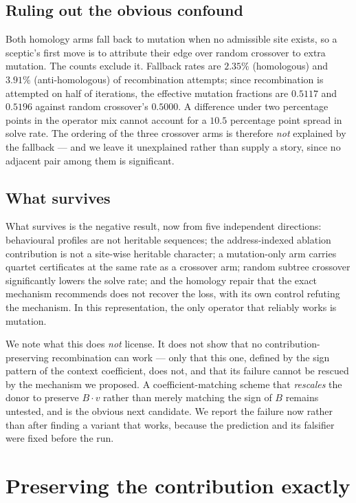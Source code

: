 \documentclass[11pt,a4paper]{article}
\theoremstyle{definition}
\theoremstyle{remark}
\begin{document}
\subsection{Ruling out the obvious confound}

Both homology arms fall back to mutation when no admissible site exists, so a
sceptic's first move is to attribute their edge over random crossover to extra
mutation. The counts exclude it. Fallback rates are $2.35\%$ (homologous) and
$3.91\%$ (anti-homologous) of recombination attempts; since recombination is
attempted on half of iterations, the effective mutation fractions are $0.5117$
and $0.5196$ against random crossover's $0.5000$. A difference under two
percentage points in the operator mix cannot account for a $10.5$ percentage
point spread in solve rate. The ordering of the three crossover arms is
therefore \emph{not} explained by the fallback --- and we leave it unexplained
rather than supply a story, since no adjacent pair among them is significant.

\subsection{What survives}

What survives is the negative result, now from five independent directions:
behavioural profiles are not heritable sequences; the address-indexed ablation
contribution is not a site-wise heritable character; a mutation-only arm carries
quartet certificates at the same rate as a crossover arm; random subtree
crossover significantly lowers the solve rate; and the homology repair that the
exact mechanism recommends does not recover the loss, with its own control
refuting the mechanism. In this representation, the only operator that reliably
works is mutation.

We note what this does \emph{not} license. It does not show that no
contribution-preserving recombination can work --- only that this one, defined by
the sign pattern of the context coefficient, does not, and that its failure
cannot be rescued by the mechanism we proposed. A coefficient-matching scheme
that \emph{rescales} the donor to preserve $B\cdot v$ rather than merely matching
the sign of $B$ remains untested, and is the obvious next candidate. We report
the failure now rather than after finding a variant that works, because the
prediction and its falsifier were fixed before the run.

\section{Preserving the contribution exactly}\label{sec:preserving}
\end{document}
